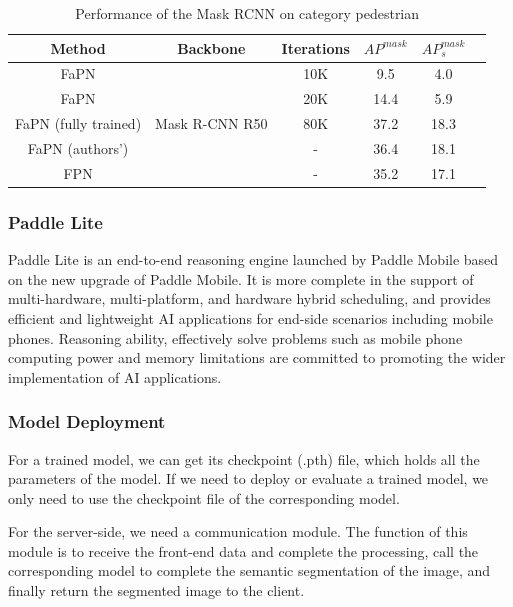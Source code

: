 \begin{table}[htb]
		\begin{center}
			\caption{Performance of the Mask RCNN on category pedestrian}\label{table2}
			\begin{tabular}{|c|c|c|c|c|c} %
				\toprule
				\textbf{Method} & \textbf{Backbone}&\textbf{Iterations} & $AP^{mask}$ & $AP^{mask}_s$ \\
				\hline
				FaPN & \multirow{5}{*}{Mask R-CNN R50}&10K&9.5&4.0 \\
				FaPN & &20K&14.4&5.9 \\
				FaPN (fully trained) & &80K &37.2&18.3 \\
				FaPN (authors') & &- &36.4&18.1 \\
				FPN & &- &35.2&17.1 \\
				\bottomrule
			\end{tabular}
		\end{center}
	\end{table}


\subsubsection{Paddle Lite}
Paddle Lite \cite{paddlelite} is an end-to-end reasoning engine launched by Paddle Mobile based on the new upgrade of Paddle Mobile. It is more complete in the support of multi-hardware, multi-platform, and hardware hybrid scheduling, and provides efficient and lightweight AI applications for end-side scenarios including mobile phones. Reasoning ability, effectively solve problems such as mobile phone computing power and memory limitations are committed to promoting the wider implementation of AI applications.

\subsubsection{Model Deployment}


For a trained model, we can get its checkpoint (.pth) file, which holds all the parameters of the model. If we need to deploy or evaluate a trained model, we only need to use the checkpoint file of the corresponding model.


For the server-side, we need a communication module. The function of this module is to receive the front-end data and complete the processing, call the corresponding model to complete the semantic segmentation of the image, and finally return the segmented image to the client.


